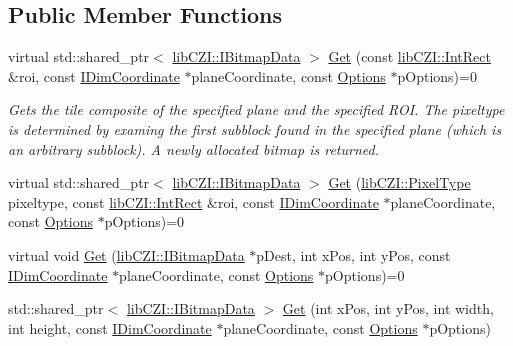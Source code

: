 \subsection*{Public Member Functions}
\begin{DoxyCompactItemize}
\item 
virtual std\+::shared\+\_\+ptr$<$ \hyperlink{classlib_c_z_i_1_1_i_bitmap_data}{lib\+C\+Z\+I\+::\+I\+Bitmap\+Data} $>$ \hyperlink{classlib_c_z_i_1_1_i_single_channel_tile_accessor_a50e17c0c197bf5f782a67e044dd4e943}{Get} (const \hyperlink{structlib_c_z_i_1_1_int_rect}{lib\+C\+Z\+I\+::\+Int\+Rect} \&roi, const \hyperlink{classlib_c_z_i_1_1_i_dim_coordinate}{I\+Dim\+Coordinate} $\ast$plane\+Coordinate, const \hyperlink{structlib_c_z_i_1_1_i_single_channel_tile_accessor_1_1_options}{Options} $\ast$p\+Options)=0
\begin{DoxyCompactList}\small\item\em Gets the tile composite of the specified plane and the specified R\+OI. The pixeltype is determined by examing the first subblock found in the specified plane (which is an arbitrary subblock). A newly allocated bitmap is returned. \end{DoxyCompactList}\item 
virtual std\+::shared\+\_\+ptr$<$ \hyperlink{classlib_c_z_i_1_1_i_bitmap_data}{lib\+C\+Z\+I\+::\+I\+Bitmap\+Data} $>$ \hyperlink{classlib_c_z_i_1_1_i_single_channel_tile_accessor_a4fb81512693a2d7221abece14c33d1f3}{Get} (\hyperlink{namespacelib_c_z_i_abf8ce12ab88b06c8b3b47efbb5e2e834}{lib\+C\+Z\+I\+::\+Pixel\+Type} pixeltype, const \hyperlink{structlib_c_z_i_1_1_int_rect}{lib\+C\+Z\+I\+::\+Int\+Rect} \&roi, const \hyperlink{classlib_c_z_i_1_1_i_dim_coordinate}{I\+Dim\+Coordinate} $\ast$plane\+Coordinate, const \hyperlink{structlib_c_z_i_1_1_i_single_channel_tile_accessor_1_1_options}{Options} $\ast$p\+Options)=0
\item 
virtual void \hyperlink{classlib_c_z_i_1_1_i_single_channel_tile_accessor_a275295786554ca6dbf9f2d0b3086dcad}{Get} (\hyperlink{classlib_c_z_i_1_1_i_bitmap_data}{lib\+C\+Z\+I\+::\+I\+Bitmap\+Data} $\ast$p\+Dest, int x\+Pos, int y\+Pos, const \hyperlink{classlib_c_z_i_1_1_i_dim_coordinate}{I\+Dim\+Coordinate} $\ast$plane\+Coordinate, const \hyperlink{structlib_c_z_i_1_1_i_single_channel_tile_accessor_1_1_options}{Options} $\ast$p\+Options)=0
\item 
std\+::shared\+\_\+ptr$<$ \hyperlink{classlib_c_z_i_1_1_i_bitmap_data}{lib\+C\+Z\+I\+::\+I\+Bitmap\+Data} $>$ \hyperlink{classlib_c_z_i_1_1_i_single_channel_tile_accessor_a9ef98a25e06e5da36d811705bb076dcc}{Get} (int x\+Pos, int y\+Pos, int width, int height, const \hyperlink{classlib_c_z_i_1_1_i_dim_coordinate}{I\+Dim\+Coordinate} $\ast$plane\+Coordinate, const \hyperlink{structlib_c_z_i_1_1_i_single_channel_tile_accessor_1_1_options}{Options} $\ast$p\+Options)

\end{DoxyCompactItemize}
